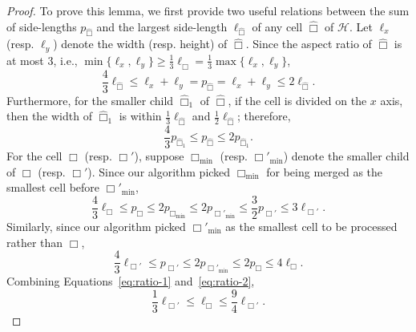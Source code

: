 \documentclass[11pt,onecolumn]{article}
\def\mcH{{\mathcal{H}}}
\newcommand{\cell}{\Box}
\begin{document}
 
\ratio*
%
%
%
%
%
%
%
%
%
%
%
%
\begin{proof}
    To prove this lemma, we first provide two useful relations between the sum of side-lengths $p_{\hat{\cell}}$ and the largest side-length $\ell_{\hat{\cell}}$ of any cell $\hat{\cell}$ of $\mcH$. Let $\ell_x$ (resp. $\ell_y$) denote the width (resp. height) of $\hat\cell$. Since the aspect ratio of $\hat{\cell}$ is at most $3$, i.e., $\min\{\ell_x, \ell_y\} \ge \frac{1}{3}\ell_{\hat{\cell}} = \frac{1}{3}\max\{\ell_x, \ell_y\}$, 
    \begin{equation*}\label{eq:ratio-edge}
        \frac{4}{3}\ell_{\hat{\cell}} \le \ell_x + \ell_y = p_{\hat{\cell}} =\ell_x + \ell_y \le 2\ell_{\hat{\cell}}.
    \end{equation*}
    Furthermore, for the smaller child $\hat{\cell}_1$ of $\hat{\cell}$, if the cell is divided on the $x$ axis, then the width of $\hat{\cell}_1$ is within  $\frac{1}{3}\ell_{\hat\cell}$ and $\frac{1}{2}\ell_{\hat\cell}$; therefore,
    \begin{equation*}
        \frac{4}{3}p_{\hat{\cell}_1}\le p_{\hat\cell} \le 2 p_{\hat{\cell}_1}.
    \end{equation*}
    For the cell $\cell$ (resp. $\cell'$), suppose $\cell_{\min}$ (resp. $\cell'_{\min}$) denote the smaller child of $\cell$ (resp. $\cell'$). Since our algorithm picked $\cell_{\min}$ for being merged as the smallest cell before $\cell'_{\min}$, 
    \begin{equation}\label{eq:ratio-1}
        \frac{4}{3}\ell_\cell\le p_\cell\le 2p_{\cell_{\min}}\le 2p_{\cell'_{\min}}\le \frac{3}{2}p_{\cell'}\le 3\ell_{\cell'}.
    \end{equation}
    Similarly, since our algorithm picked $\cell'_{\min}$ as the smallest cell to be processed rather than $\cell$,
    \begin{equation}\label{eq:ratio-2}
        \frac{4}{3}\ell_{\cell'}\le p_{\cell'}\le 2p_{\cell'_{\min}}\le 2p_{\cell}\le 4\ell_\cell.
    \end{equation}
    Combining Equations~\eqref{eq:ratio-1} and~\eqref{eq:ratio-2},
    \begin{equation*}
        \frac{1}{3} \ell_{\cell'} \le \ell_\cell \le \frac{9}{4} \ell_{\cell'}.
    \end{equation*}
\end{proof}

%
\end{document}
